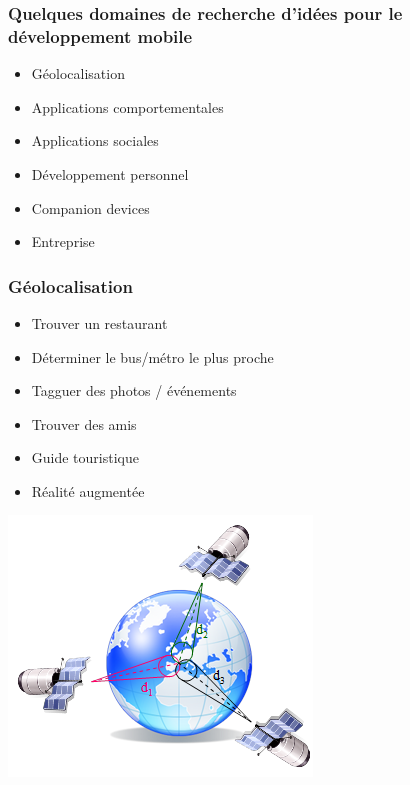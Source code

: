 \documentclass{beamer}
\begin{document}
\begin{frame}
\frametitle{Quelques domaines de recherche d'idées pour le développement mobile}

\begin{itemize}
	\item Géolocalisation
	\item Applications comportementales
	\item Applications sociales
	\item Développement personnel
	\item Companion devices
	\item Entreprise
\end{itemize}

\end{frame}

\begin{frame}
\frametitle{Géolocalisation}
\begin{itemize}
	\item Trouver un restaurant
	\item Déterminer le bus/métro le plus proche
	\item Tagguer des photos / événements
	\item Trouver des amis
	\item Guide touristique
	\item Réalité augmentée
\end{itemize}
\begin{center}
\includegraphics[scale=0.2]{geo.png}
\end{center}
\end{frame}
\end{document}
